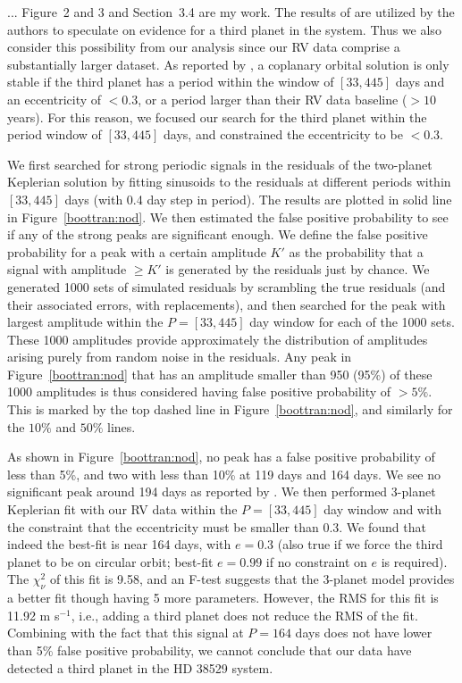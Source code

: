 \cite{2013ApJ...768..155H}... Figure~2 and 3 and Section~3.4 are my
work. The results of \cite{2010AJ....139.1844B} are utilized by the
authors to speculate on evidence for a third planet in the
system. Thus we also consider this possibility from our analysis since
our RV data comprise a substantially larger dataset. As reported by
\cite{2010AJ....139.1844B}, a coplanary orbital solution is only
stable if the third planet has a period within the window of
$[33,445]$ days and an eccentricity of $<0.3$, or a period larger than
their RV data baseline ($>10$ years). For this reason, we focused our
search for the third planet within the period window of $[33,445]$
days, and constrained the eccentricity to be $<0.3$.

We first searched for strong periodic signals in the residuals of the
two-planet Keplerian solution by fitting sinusoids to the residuals at
different periods within $[33,445]$ days (with 0.4 day step in
period). The results are plotted in solid line in Figure~\ref{boottran:nod}. We then
estimated the false positive probability to see if any of the strong
peaks are significant enough. We define the false positive probability
for a peak with a certain amplitude $K'$ as the probability that a
signal with amplitude $\geq K'$ is generated by the residuals just by
chance. We generated 1000 sets of simulated residuals by scrambling
the true residuals (and their associated errors, with replacements),
and then searched for the peak with largest amplitude within the
$P=[33,445]$ day window for each of the 1000 sets. These 1000
amplitudes provide approximately the distribution of amplitudes
arising purely from random noise in the residuals. Any peak in
Figure~\ref{boottran:nod} that has an amplitude smaller than 950 (95\%) of these 1000
amplitudes is thus considered having false positive probability of
$>5\%$. This is marked by the top dashed line in Figure~\ref{boottran:nod}, and
similarly for the $10\%$ and $50\%$ lines.

As shown in Figure~\ref{boottran:nod}, no peak has a false positive probability of less
than 5\%, and two with less than 10\% at 119 days and 164 days. We see
no significant peak around 194 days as reported by
\cite{2010AJ....139.1844B}. We then performed 3-planet Keplerian fit
with our RV data within the $P=[33,445]$ day window and with the
constraint that the eccentricity must be smaller than 0.3. We found
that indeed the best-fit is near 164 days, with $e=0.3$ (also true if
we force the third planet to be on circular orbit; best-fit $e=0.99$
if no constraint on $e$ is required). The $\chi_{\nu}^2$ of this fit
is 9.58, and an F-test suggests that the 3-planet model provides a
better fit though having 5 more parameters. However, the RMS for this
fit is 11.92 m s$^{-1}$, i.e., adding a third planet does not reduce
the RMS of the fit. Combining with the fact that this signal at
$P=164$ days does not have lower than 5\% false positive probability,
we cannot conclude that our data have detected a third planet in the
HD 38529 system.

